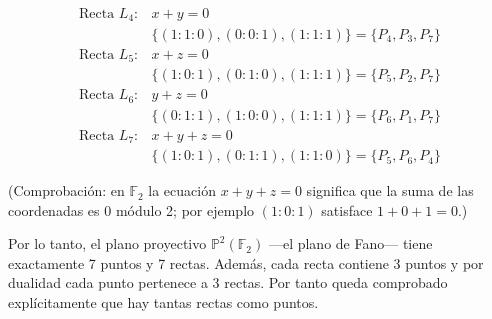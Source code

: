 {\[\begin{array}{ll}
    \text{Recta } L_4: & x+y=0 \\
                    & \{(1:1:0),(0:0:1),(1:1:1)\} = \{P_4,P_3,P_7\} \\[6pt]

    \text{Recta } L_5: & x+z=0 \\
                    & \{(1:0:1),(0:1:0),(1:1:1)\} = \{P_5,P_2,P_7\} \\[6pt]

    \text{Recta } L_6: & y+z=0 \\
                    & \{(0:1:1),(1:0:0),(1:1:1)\} = \{P_6,P_1,P_7\} \\[6pt]

    \text{Recta } L_7: & x+y+z=0 \\
                    & \{(1:0:1),(0:1:1),(1:1:0)\} = \{P_5,P_6,P_4\}
    \end{array}
    \]

    (Comprobación: en \(\mathbb{F}_2\) la ecuación $x+y+z=0$ significa que la suma de las coordenadas es $0$ módulo 2; por ejemplo $(1:0:1)$ satisface $1+0+1=0$.)

    Por lo tanto, el plano proyectivo \(\mathbb{P}^2(\mathbb{F}_2)\) —el plano de Fano— tiene exactamente 7 puntos y 7 rectas. Además, cada recta contiene 3 puntos y por dualidad cada punto pertenece a 3 rectas. Por tanto queda comprobado explícitamente que hay tantas rectas como puntos.

}

